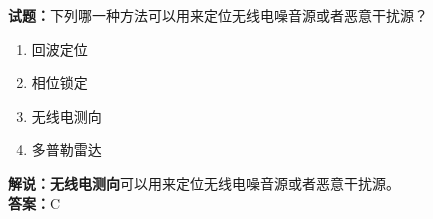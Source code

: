 \documentclass{ctexbook}
\begin{document}
\bigskip


\noindent\textbf{试题：}下列哪一种方法可以用来定位无线电噪音源或者恶意干扰源？
\begin{enumerate}[leftmargin=3em]
\item 回波定位
\item 相位锁定
\item 无线电测向
\item 多普勒雷达
\end{enumerate}
\noindent\textbf{解说：}\textbf{无线电测向}可以用来定位无线电噪音源或者恶意干扰源。\\\noindent\textbf{答案：}C







%
\end{document}
